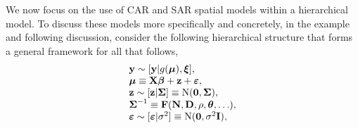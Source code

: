 \documentclass[11pt, titlepage]{article}\usepackage[]{graphicx}\usepackage[]{color}
\begin{document}
\begin{spacing}{1.9}
\begin{flushleft}
We now focus on the use of CAR and SAR spatial models within a hierarchical model. To discuss these models more specifically and concretely, in the example and following discussion, consider the following hierarchical structure that forms a general framework for all that follows,
\begin{equation} \label{eq:HMsetup}
  \begin{array} {l}
    \mathbf{y} \sim [\mathbf{y}|g(\mbox{\boldmath $\mu$}),\mbox{\boldmath $\xi$}], \\
    \mbox{\boldmath $\mu$} \equiv \mathbf{X} {\boldsymbol{\beta}} + \mathbf{z}  + \mbox{\boldmath $\varepsilon$}, \\
		\mathbf{z} \sim \textrm{$[\mathbf{z}|\mbox{\boldmath $\Sigma$}]$} \equiv \textrm{N}(\mathbf{0},\mbox{\boldmath $\Sigma$}), \\
    \mbox{\boldmath $\Sigma$}^{-1} \equiv \mathbf{F}(\mathbf{N}, \mathbf{D},\rho,\mbox{\boldmath $\theta$},\ldots), \\
		\mbox{\boldmath $\varepsilon$} \sim \textrm{$[\mbox{\boldmath $\varepsilon$}|\sigma^2]$} \equiv \textrm{N}(\mathbf{0},\sigma^2\mathbf{I}), 
  \end{array}
\end{equation}

\end{flushleft}
\end{spacing}
\end{document}
